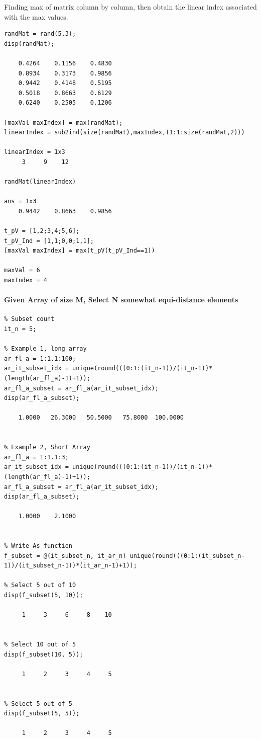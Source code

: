 \documentclass[
]{book}
\begin{document}
Finding max of matrix column by column, then obtain the linear index
associated with the max values.

\begin{verbatim}
randMat = rand(5,3);
disp(randMat);

    0.4264    0.1156    0.4830
    0.8934    0.3173    0.9856
    0.9442    0.4148    0.5195
    0.5018    0.8663    0.6129
    0.6240    0.2505    0.1206

[maxVal maxIndex] = max(randMat);
linearIndex = sub2ind(size(randMat),maxIndex,(1:1:size(randMat,2)))

linearIndex = 1x3    
     3     9    12

randMat(linearIndex)

ans = 1x3    
    0.9442    0.8663    0.9856

t_pV = [1,2;3,4;5,6];
t_pV_Ind = [1,1;0,0;1,1];
[maxVal maxIndex] = max(t_pV(t_pV_Ind==1))

maxVal = 6
maxIndex = 4
\end{verbatim}

\hypertarget{given-array-of-size-m-select-n-somewhat-equi-distance-elements}{%
\paragraph{Given Array of size M, Select N somewhat equi-distance elements}\label{given-array-of-size-m-select-n-somewhat-equi-distance-elements}}

\begin{verbatim}
% Subset count
it_n = 5;

% Example 1, long array
ar_fl_a = 1:1.1:100;
ar_it_subset_idx = unique(round(((0:1:(it_n-1))/(it_n-1))*(length(ar_fl_a)-1)+1));
ar_fl_a_subset = ar_fl_a(ar_it_subset_idx);
disp(ar_fl_a_subset);

    1.0000   26.3000   50.5000   75.8000  100.0000


% Example 2, Short Array
ar_fl_a = 1:1.1:3;
ar_it_subset_idx = unique(round(((0:1:(it_n-1))/(it_n-1))*(length(ar_fl_a)-1)+1));
ar_fl_a_subset = ar_fl_a(ar_it_subset_idx);
disp(ar_fl_a_subset);

    1.0000    2.1000


% Write As function
f_subset = @(it_subset_n, it_ar_n) unique(round(((0:1:(it_subset_n-1))/(it_subset_n-1))*(it_ar_n-1)+1));

% Select 5 out of 10
disp(f_subset(5, 10));

     1     3     6     8    10


% Select 10 out of 5
disp(f_subset(10, 5));

     1     2     3     4     5


% Select 5 out of 5
disp(f_subset(5, 5));

     1     2     3     4     5
\end{verbatim}
\end{document}

